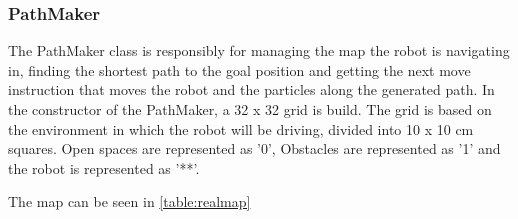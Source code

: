 \documentclass[Main]{subfiles}
\begin{document}
		\subsubsection{PathMaker} %
	\label{subsub:software_pathmaker}
	
	The PathMaker class is responsibly for managing the map the robot is navigating in, finding the shortest path to the goal position and getting the next move instruction that moves the robot and the particles along the generated path.
	In the constructor of the PathMaker, a 32 x 32 grid is build. The grid is based on the environment in which the robot will be driving, divided into 10 x 10 cm squares. 
	Open spaces are represented as '0', Obstacles are represented as '1' and the robot is represented as '**'.
	
	The map can be seen in \autoref{table:realmap}
	
\end{document}
